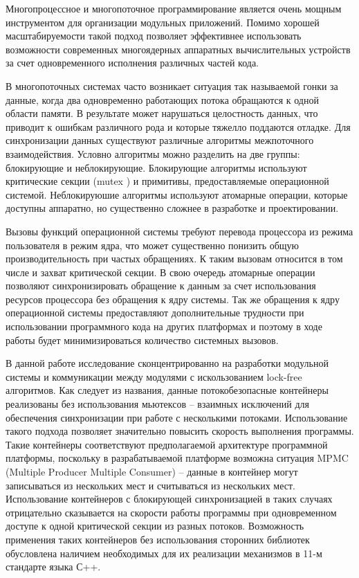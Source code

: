 Многопроцессное и многопоточное программирование является очень мощным инструментом для организации модульных приложений. Помимо хорошей масштабируемости такой подход позволяет эффективнее использовать возможности современных многоядерных аппаратных вычислительных устройств за счет одновременного исполнения различных частей кода.

В многопоточных системах часто возникает ситуация так называемой гонки за данные, когда два одновременно работающих потока обращаются к одной области памяти. В результате может нарушаться целостность данных, что приводит к ошибкам различного рода и которые тяжелло поддаются отладке. Для синхронизации данных существуют различные алгоритмы межпоточного взаимодействия. Условно алгоритмы можно разделить на две группы: блокирующие и неблокирующие. Блокирующие алгоритмы используют критические секции (mutex ) и примитивы, предоставляемые операционной системой. Неблокируюшие алгоритмы используют атомарные операции, которые доступны аппаратно, но существенно сложнее в разработке и проектировании.

Вызовы функций операционной системы требуют перевода процессора из режима пользователя в режим ядра, что может существенно понизить общую производительность при частых обращениях. К таким вызовам относится в том числе и захват критической секции. В свою очередь атомарные операции позволяют синхронизировать обращение к данным за счет использования ресурсов процессора без обращения к ядру системы. Так же обращения к ядру операционной системы предоставляют дополнительные трудности при использовании программного кода на других платформах и поэтому в ходе работы будет минимизироваться количество системных вызовов.

В данной работе исследование сконцентрированно на разработки модульной системы и коммуникации между модулями с искользованием lock-free алгоритмов. Как следует из названия, данные потокобезопасные контейнеры реализованы без использования мьютексов – взаимных исключений для обеспечения синхронизации при работе с несколькими потоками. Использование такого подхода позволяет значительно повысить скорость выполнения программы. Такие контейнеры соответствуют предполагаемой архитектуре программной платформы, поскольку в разрабатываемой платформе возможна ситуация MPMC (Multiple Producer Multiple Consumer) – данные в контейнер могут записываться из нескольких мест и считываться из нескольких мест. Использование контейнеров с блокирующей синхронизацией в таких случаях отрицательно сказывается на скорости работы программы при одновременном доступе к одной критической секции из разных потоков. Возможность применения таких контейнеров без использования сторонних библиотек обусловлена наличием необходимых для их реализации механизмов в 11-м стандарте языка С++.

